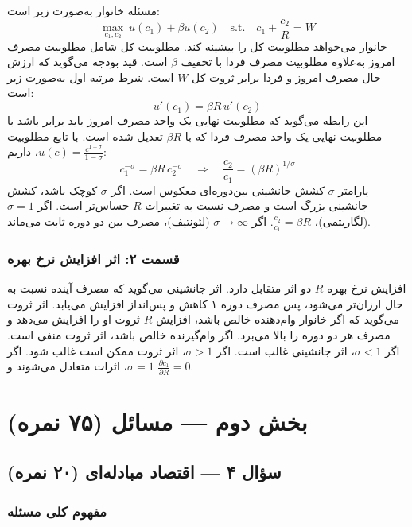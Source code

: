 \documentclass[12pt,a4paper]{article}
\begin{document}
مسئله خانوار به‌صورت زیر است:
\[
	\max_{c_1, c_2} \ u(c_1) + \beta u(c_2)
	\quad \text{s.t.} \quad
	c_1 + \frac{c_2}{R} = W
\]
خانوار می‌خواهد مطلوبیت کل را بیشینه کند. مطلوبیت کل شامل مطلوبیت مصرف امروز به‌علاوه مطلوبیت مصرف فردا با تخفیف $\beta$ است. قید بودجه می‌گوید که ارزش حال مصرف امروز و فردا برابر ثروت کل $W$ است. شرط مرتبه اول به‌صورت زیر است:
\[
	u'(c_1) = \beta R \, u'(c_2)
\]
این رابطه می‌گوید که مطلوبیت نهایی یک واحد مصرف امروز باید برابر باشد با مطلوبیت نهایی یک واحد مصرف فردا که با $\beta R$ تعدیل شده است. با تابع مطلوبیت $u(c) = \frac{c^{1-\sigma}}{1-\sigma}$، داریم:
\[
	c_1^{-\sigma} = \beta R \, c_2^{-\sigma}
	\quad \Rightarrow \quad
	\frac{c_2}{c_1} = (\beta R)^{1/\sigma}
\]
پارامتر $\sigma$ کشش جانشینی بین‌دوره‌ای معکوس است. اگر $\sigma$ کوچک باشد، کشش جانشینی بزرگ است و مصرف نسبت به تغییرات $R$ حساس‌تر است. اگر $\sigma = 1$ (لگاریتمی)، $\frac{c_2}{c_1} = \beta R$. اگر $\sigma \to \infty$ (لئونتیف)، مصرف بین دو دوره ثابت می‌ماند.

\subsubsection*{قسمت ۲: اثر افزایش نرخ بهره}

افزایش نرخ بهره $R$ دو اثر متقابل دارد. اثر جانشینی می‌گوید که مصرف آینده نسبت به حال ارزان‌تر می‌شود، پس مصرف دوره ۱ کاهش و پس‌انداز افزایش می‌یابد. اثر ثروت می‌گوید که اگر خانوار وام‌دهنده خالص باشد، افزایش $R$ ثروت او را افزایش می‌دهد و مصرف هر دو دوره را بالا می‌برد. اگر وام‌گیرنده خالص باشد، اثر ثروت منفی است. اگر $\sigma < 1$، اثر جانشینی غالب است. اگر $\sigma > 1$، اثر ثروت ممکن است غالب شود. اگر $\sigma = 1$، اثرات متعادل می‌شوند و $\frac{\partial c_1}{\partial R} = 0$.

\section{بخش دوم — مسائل (۷۵ نمره)}

\subsection{سؤال ۴ — اقتصاد مبادله‌ای (۲۰ نمره)}

\subsubsection*{مفهوم کلی مسئله}
\end{document}
